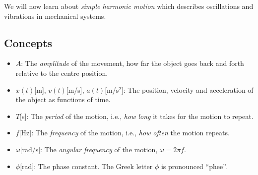 \documentclass[letterpaper,9pt,journal]{IEEEtran}
\begin{document}
We will now learn about \emph{simple harmonic motion} 
which describes oscillations and vibrations in mechanical systems.

%



\vspace{-3mm}
\subsection{Concepts}
\label{ff4e01de0bd379280a0157bd102cc5f0}%

\begin{itemize}
\item  $A$: The \emph{amplitude} of the movement, how far the object goes back and forth relative to the centre position.
\item  $x(t)$[m], $v(t)$[m/s], $a(t)$[m/s$^2$]: The position, velocity and acceleration of the object as functions of time.
\item  $T$[s]: The \emph{period} of the motion, i.e., \emph{how long} it takes for the motion to repeat. 
\item  $f$[Hz]: The \emph{frequency} of the motion, i.e., \emph{how often} the motion repeats.
\item  $\omega$[rad/s]: The \emph{angular frequency} of the motion, $\omega = 2\pi f$.
\item  $\phi$[rad]: The phase constant. The Greek letter $\phi$ is pronounced ``phee''. 
\end{itemize}
\end{document}
